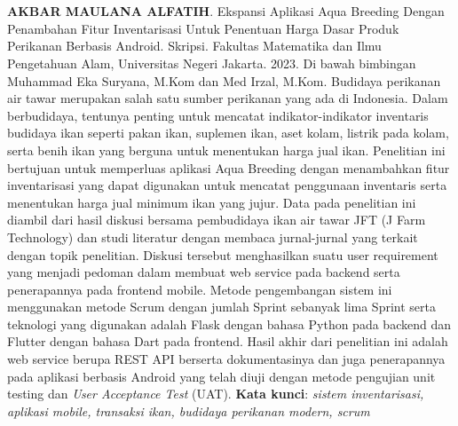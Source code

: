\chapter*{}

\begin{spacing}{1}
\textbf{AKBAR MAULANA ALFATIH}. Ekspansi Aplikasi Aqua Breeding Dengan Penambahan Fitur Inventarisasi Untuk Penentuan Harga Dasar Produk Perikanan Berbasis Android. Skripsi. Fakultas Matematika dan Ilmu Pengetahuan Alam, Universitas Negeri Jakarta. 2023. Di bawah bimbingan Muhammad Eka Suryana, M.Kom dan Med Irzal, M.Kom.
\newline
\newline
Budidaya perikanan air tawar merupakan salah satu sumber perikanan yang ada di Indonesia. Dalam berbudidaya, tentunya penting untuk mencatat indikator-indikator inventaris budidaya ikan seperti pakan ikan, suplemen ikan, aset kolam, listrik pada kolam, serta benih ikan yang berguna untuk menentukan harga jual ikan. Penelitian ini bertujuan untuk  memperluas aplikasi Aqua Breeding dengan menambahkan fitur inventarisasi yang dapat digunakan untuk mencatat penggunaan inventaris serta menentukan harga jual minimum ikan yang jujur. Data pada penelitian ini diambil dari hasil diskusi bersama pembudidaya ikan air tawar JFT (J Farm Technology) dan studi literatur dengan membaca jurnal-jurnal yang terkait dengan topik penelitian. Diskusi tersebut menghasilkan suatu user requirement yang menjadi pedoman dalam membuat web service pada backend serta penerapannya pada frontend mobile. Metode pengembangan sistem ini menggunakan metode Scrum dengan jumlah Sprint sebanyak lima Sprint serta teknologi yang digunakan adalah Flask dengan bahasa Python pada backend dan Flutter dengan bahasa Dart pada frontend. Hasil akhir dari penelitian ini adalah web service berupa REST API berserta dokumentasinya dan juga penerapannya pada aplikasi berbasis Android yang telah diuji dengan metode pengujian unit testing dan \textit{User Acceptance Test} (UAT).
\newline
\newline
\noindent \textbf{Kata kunci}: \textit{sistem inventarisasi, aplikasi mobile, transaksi ikan, budidaya perikanan modern, scrum}
\end{spacing}